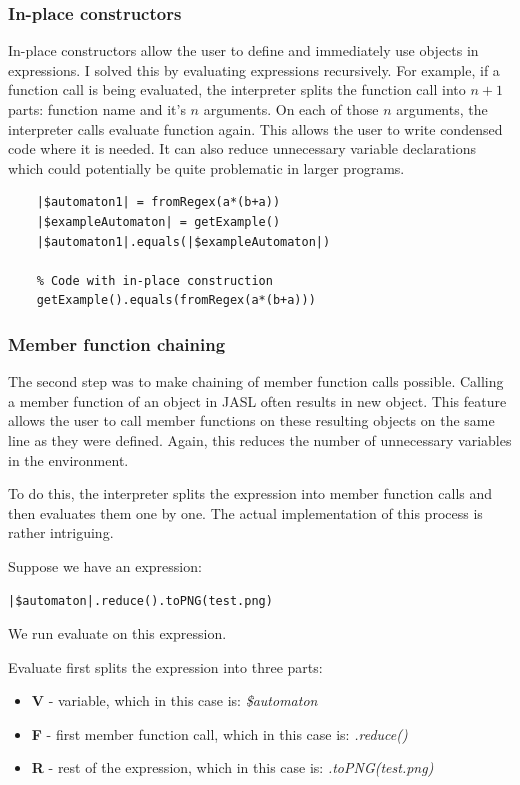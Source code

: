 \documentclass{ctuthesis}
\begin{document}
\subsubsection{In-place constructors}
In-place constructors allow the user to define and immediately use objects in expressions. I solved this by evaluating expressions recursively. For example, if a function call is being evaluated, the interpreter splits the function call into $n+1$ parts: function name and it's $n$ arguments. On each of those $n$ arguments, the interpreter calls evaluate function again. This allows the user to write condensed code where it is needed. It can also reduce unnecessary variable declarations which could potentially be quite problematic in larger programs.

\begin{minipage}{\linewidth}
\begin{lstlisting}[language = JASL]
	% Code without in-place construction
	|$automaton1| = fromRegex(a*(b+a))
	|$exampleAutomaton| = getExample()
	|$automaton1|.equals(|$exampleAutomaton|)
	
	% Code with in-place construction
	getExample().equals(fromRegex(a*(b+a)))
\end{lstlisting}
\end{minipage}

\subsubsection{Member function chaining}
\label{chaining_impl}
The second step was to make chaining of member function calls possible. Calling a member function of an object in JASL often results in new object. This feature allows the user to call member functions on these resulting objects on the same line as they were defined. Again, this reduces the number of unnecessary variables in the environment.

To do this, the interpreter splits the expression into member function calls and then evaluates them one by one. The actual implementation of this process is rather intriguing. 

Suppose we have an expression:
\begin{lstlisting}[language = JASL_snippet]
	|$automaton|.reduce().toPNG(test.png)
\end{lstlisting}
We run evaluate on this expression.

Evaluate first splits the expression into three parts:
\begin{itemize}
	\item \textbf{V} - variable, which in this case is: \textit{\$automaton}
	\item \textbf{F} - first member function call, which in this case is: \textit{.reduce()}
	\item \textbf{R} - rest of the expression, which in this case is: \textit{.toPNG(test.png)}
\end{itemize}
\end{document}
